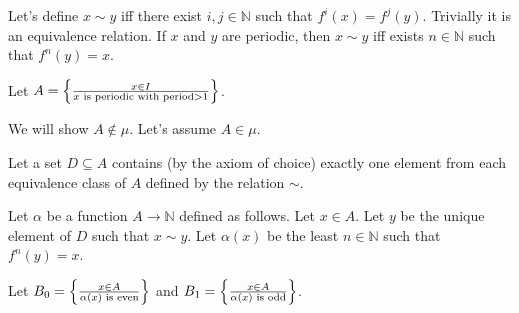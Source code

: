 Let's define $x\sim y$ iff there exist $i,j\in\mathbb{N}$ such that
$f^{i}(x)=f^{j}(y)$. Trivially it is an equivalence relation. If
$x$ and $y$ are periodic, then $x\sim y$ iff exists $n\in\mathbb{N}$
such that $f^{n}(y)=x$.

Let $A=\left\{ \frac{x\in I}{x\text{ is periodic with period}>1}\right\}$.

We will show $A\notin\mu$. Let's assume $A\in\mu$.

Let a set $D\subseteq A$ contains (by the axiom of choice) exactly
one element from each equivalence class of $A$ defined by the relation
$\sim$.

Let $\alpha$ be a function $A\rightarrow\mathbb{N}$ defined as follows.
Let $x\in A$. Let $y$ be the unique element of $D$ such that $x\sim y$.
Let $\alpha(x)$ be the least $n\in\mathbb{N}$ such that $f^{n}(y)=x$.

Let $B_{0}=\left\{ \frac{x\in A}{\alpha(x)\text{ is even}}\right\}$ and $B_{1}=\left\{ \frac{x\in A}{\alpha(x)\text{ is odd}}\right\}$.

